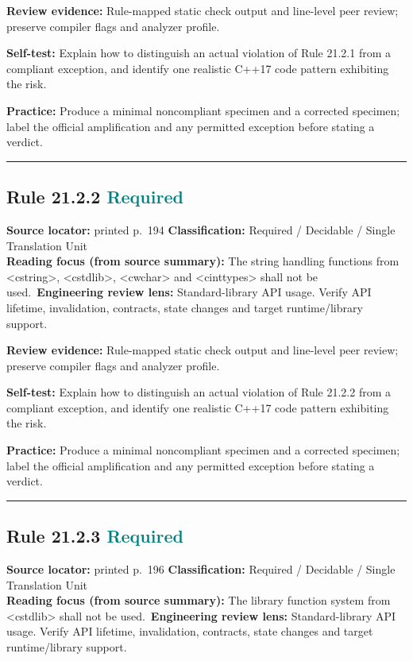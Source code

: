 \documentclass[10pt,letterpaper]{article}
\begin{document}
\textbf{Review evidence:} Rule-mapped static check output and line-level peer review; preserve compiler flags and analyzer profile.

\textbf{Self-test:} Explain how to distinguish an actual violation of Rule 21.2.1 from a compliant exception, and identify one realistic C++17 code pattern exhibiting the risk.\par
\textbf{Practice:} Produce a minimal noncompliant specimen and a corrected specimen; label the official amplification and any permitted exception before stating a verdict.
\smallskip\hrule\smallskip
\subsection*{Rule 21.2.2 \enspace \texorpdfstring{\small\textcolor{teal}{Required}}{Required}}
\noindent\textbf{Source locator:} printed p.~194 \quad\textbf{Classification:} Required / Decidable / Single Translation Unit\\
\textbf{Reading focus (from source summary):} The string handling functions from \textless{}cstring\textgreater{}, \textless{}cstdlib\textgreater{}, \textless{}cwchar\textgreater{} and \textless{}cinttypes\textgreater{} shall not be used.\
\textbf{Engineering review lens:} Standard-library API usage. Verify API lifetime, invalidation, contracts, state changes and target runtime/library support.

\textbf{Review evidence:} Rule-mapped static check output and line-level peer review; preserve compiler flags and analyzer profile.

\textbf{Self-test:} Explain how to distinguish an actual violation of Rule 21.2.2 from a compliant exception, and identify one realistic C++17 code pattern exhibiting the risk.\par
\textbf{Practice:} Produce a minimal noncompliant specimen and a corrected specimen; label the official amplification and any permitted exception before stating a verdict.
\smallskip\hrule\smallskip
\subsection*{Rule 21.2.3 \enspace \texorpdfstring{\small\textcolor{teal}{Required}}{Required}}
\noindent\textbf{Source locator:} printed p.~196 \quad\textbf{Classification:} Required / Decidable / Single Translation Unit\\
\textbf{Reading focus (from source summary):} The library function system from \textless{}cstdlib\textgreater{} shall not be used.\
\textbf{Engineering review lens:} Standard-library API usage. Verify API lifetime, invalidation, contracts, state changes and target runtime/library support.
\end{document}
